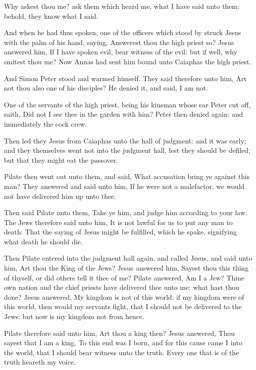 \verse Why askest thou me? ask them which heard me, what I have said unto them: behold, they know what I said.

\verse And when he had thus spoken, one of the officers which stood by struck Jesus with the palm of his hand, saying, Answerest thou the high priest so?  \verse Jesus answered him, If I have spoken evil, bear witness of the evil: but if well, why smitest thou me?  \verse Now Annas had sent him bound unto Caiaphas the high priest.

\verse And Simon Peter stood and warmed himself. They said therefore unto him, Art not thou also one of his disciples? He denied it, and said, I am not.

\verse One of the servants of the high priest, being his kinsman whose ear Peter cut off, saith, Did not I see thee in the garden with him?  \verse Peter then denied again: and immediately the cock crew.

\verse Then led they Jesus from Caiaphas unto the hall of judgment: and it was early; and they themselves went not into the judgment hall, lest they should be defiled; but that they might eat the passover.

\verse Pilate then went out unto them, and said, What accusation bring ye against this man?  \verse They answered and said unto him, If he were not a malefactor, we would not have delivered him up unto thee.

\verse Then said Pilate unto them, Take ye him, and judge him according to your law. The Jews therefore said unto him, It is not lawful for us to put any man to death: \verse That the saying of Jesus might be fulfilled, which he spake, signifying what death he should die.

\verse Then Pilate entered into the judgment hall again, and called Jesus, and said unto him, Art thou the King of the Jews?  \verse Jesus answered him, Sayest thou this thing of thyself, or did others tell it thee of me?  \verse Pilate answered, Am I a Jew? Thine own nation and the chief priests have delivered thee unto me: what hast thou done?  \verse Jesus answered, My kingdom is not of this world: if my kingdom were of this world, then would my servants fight, that I should not be delivered to the Jews: but now is my kingdom not from hence.

\verse Pilate therefore said unto him, Art thou a king then? Jesus answered, Thou sayest that I am a king. To this end was I born, and for this cause came I into the world, that I should bear witness unto the truth. Every one that is of the truth heareth my voice.

